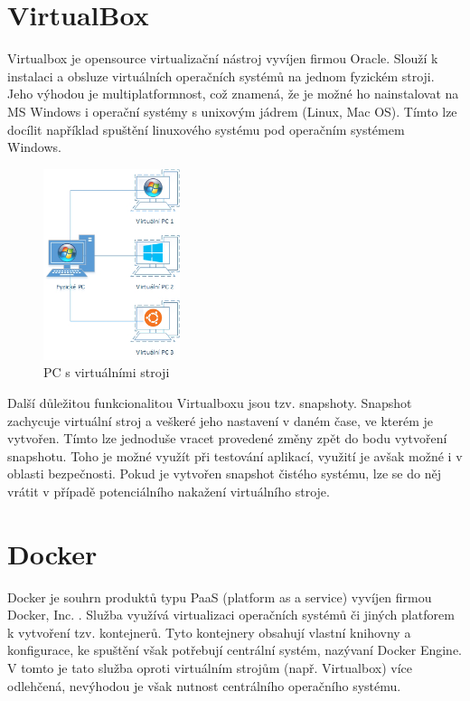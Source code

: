 \documentclass[thesis=M,czech,hidelinks]{FITthesis}[2013/05/06]
\begin{document}
\section{VirtualBox}\label{sec:virtualbox}
Virtualbox je opensource virtualizační nástroj vyvíjen firmou Oracle. Slouží k instalaci  a obsluze virtuálních operačních systémů na jednom fyzickém stroji. Jeho výhodou je multiplatformnost, což znamená, že je možné ho nainstalovat na MS Windows i operační systémy s unixovým jádrem (Linux, Mac OS). Tímto lze docílit například spuštění linuxového systému pod operačním systémem Windows.\cite{virutalbox}
\begin{figure}[h]
	\centering
	\includegraphics[width=4cm]{pictures/vbox.png}
	\caption{PC s virtuálními stroji \cite{vbox_pic}}
	\label{fig:vbox}
\end{figure}

Další důležitou funkcionalitou Virtualboxu jsou tzv. snapshoty. Snapshot zachycuje virtuální stroj a veškeré jeho nastavení v daném čase, ve kterém je vytvořen. Tímto lze jednoduše vracet provedené změny zpět do bodu vytvoření snapshotu. Toho je možné využít při testování aplikací, využití je avšak možné i v oblasti bezpečnosti. Pokud je vytvořen snapshot čistého systému, lze se do něj vrátit v případě potenciálního nakažení virtuálního stroje.


\section{Docker}\label{sec:docker}
Docker je souhrn produktů typu PaaS (platform as a service) vyvíjen firmou Docker, Inc. \cite{docker}. Služba využívá virtualizaci operačních systémů či jiných platforem k vytvoření tzv. kontejnerů. Tyto kontejnery obsahují vlastní knihovny a konfigurace, ke spuštění však potřebují centrální systém, nazývaní Docker Engine. V tomto je tato služba oproti virtuálním strojům (např. Virtualbox) více odlehčená, nevýhodou je však nutnost centrálního operačního systému. 
\end{document}
